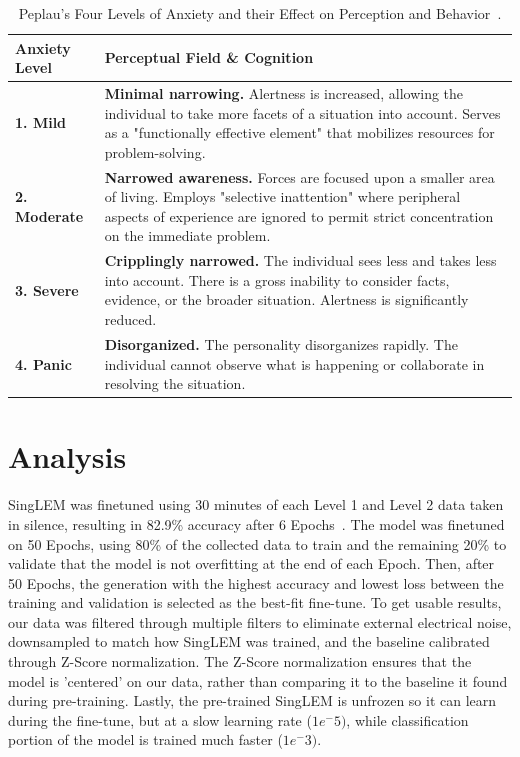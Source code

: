 \documentclass[journal]{IEEEtran}
\begin{document}
\begin{table}[htbp]
\centering
\caption{Peplau's Four Levels of Anxiety and their Effect on Perception and Behavior~\cite[pp. 126--133]{peplau1952interpersonal}.}
\label{tab:peplau_anxiety_1952}
\renewcommand{\arraystretch}{1.5} %
\begin{tabularx}{\linewidth}{@{} l >{\raggedright\arraybackslash}X @{}}
\toprule
\textbf{Anxiety Level} & \textbf{Perceptual Field \& Cognition} \\ 
\midrule
\textbf{1. Mild} & 
\textbf{Minimal narrowing.} Alertness is increased, allowing the individual to take more facets of a situation into account. Serves as a "functionally effective element" that mobilizes resources for problem-solving. \\ 

\textbf{2. Moderate} & 
\textbf{Narrowed awareness.} Forces are focused upon a smaller area of living. Employs "selective inattention" where peripheral aspects of experience are ignored to permit strict concentration on the immediate problem. \\ 

\textbf{3. Severe} & 
\textbf{Cripplingly narrowed.} The individual sees less and takes less into account. There is a gross inability to consider facts, evidence, or the broader situation. Alertness is significantly reduced. \\ 

\textbf{4. Panic} & 
\textbf{Disorganized.} The personality disorganizes rapidly. The individual cannot observe what is happening or collaborate in resolving the situation. \\ 
\bottomrule
\end{tabularx}
\vspace{1ex}
\end{table}

\section{Analysis}
SingLEM was finetuned using 30 minutes of each Level 1 and Level 2 data taken in silence, resulting in 82.9\% accuracy after 6 Epochs~\cite{jtof-dev_EE-499_2026}. The model was finetuned on 50 Epochs, using 80\% of the collected data to train and the remaining 20\% to validate that the model is not overfitting at the end of each Epoch. Then, after 50 Epochs, the generation with the highest accuracy and lowest loss between the training and validation is selected as the best-fit fine-tune. To get usable results, our data was filtered through multiple filters to eliminate external electrical noise, downsampled to match how SingLEM was trained, and the baseline calibrated through Z-Score normalization. The Z-Score normalization ensures that the model is 'centered' on our data, rather than comparing it to the baseline it found during pre-training. Lastly, the pre-trained SingLEM is unfrozen so it can learn during the fine-tune, but at a slow learning rate (\(1e^-5)\), while classification portion of the model is trained much faster (\(1e^-3)\). 
\end{document}
